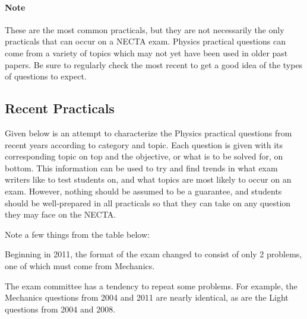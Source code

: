 \paragraph{Note} These are the most common practicals, but they are not necessarily the only practicals that can occur on a NECTA exam. Physics practical questions can come from a variety of topics which may not yet have been used in older past papers. Be sure to regularly check the most recent  to get a good idea of the types of questions to expect. 

\subsection{Recent Practicals}
Given below is an attempt to characterize the Physics practical questions from recent years according to category and topic. Each question is given with its corresponding topic on top and the objective, or what is to be solved for, on bottom. This information can be used to try and find trends in what exam writers like to test students on, and what topics are most likely to occur on an exam. However, nothing should be assumed to be a guarantee, and students should be well-prepared in all practicals so that they can take on any question they may face on the NECTA.

Note a few things from the table below:
\begin{itemize*}
\item Beginning in 2011, the format of the exam changed to consist of only 2 problems, one of which must come from Mechanics.
\item The exam committee has a tendency to repeat some problems. For example, the Mechanics questions from 2004 and 2011 are nearly identical, as are the Light questions from 2004 and 2008.
\end{itemize*}


